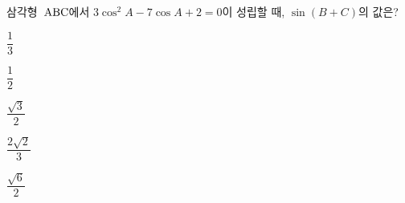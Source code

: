삼각형~$\mathrm{ABC}$에서 $3\cos^2 A-7\cos A+2=0$이 성립할 때, $\sin(B+C)$의 값은?
\begin{choices32}{\rule[-3ex]{0pt}{8ex}$\dfrac{1}{3}$}{\rule[-3ex]{0pt}{8ex}$\dfrac{1}{2}$}{\rule[-3ex]{0pt}{8ex}$\dfrac{\sqrt{3}}{2}$}{\rule[-3ex]{0pt}{8ex}$\dfrac{2\sqrt{2}}{3}$}{\rule[-3ex]{0pt}{8ex}$\dfrac{\sqrt{6}}{2}$}\end{choices32}
